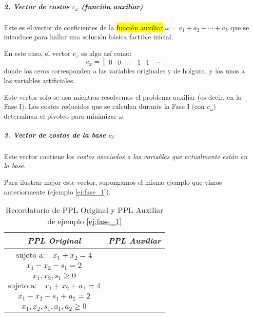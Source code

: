 \subparagraph{2. Vector de costos \(c_\omega\) (función auxiliar)}

Este es el vector de coeficientes de la \hl{función auxiliar} \(\omega = a_1 + a_2 + \cdots + a_k\) que se introduce para hallar una solución básica factible inicial.

En este caso, el vector \(c_\omega\) es algo así como:
\[
  c_\omega = \begin{bmatrix} 0 & 0 & \cdots & 1 & 1 & \cdots \end{bmatrix}
\]
donde los ceros corresponden a las variables originales y de holgura, y los unos a las variables artificiales.

Este vector solo se usa mientras resolvemos el problema auxiliar (es decir, en la Fase I). Los costos reducidos que se calculan durante la Fase I (con \(c_\omega\)) determinan el pivoteo para minimizar \(\omega\).

\vspace{5mm}

\subparagraph{3. Vector de costos de la base \(c_\beta\)}

Este vector contiene los \textit{costos asociados a las variables que actualmente están en la base}.

Para ilustrar mejor este vector, supongamos el mismo ejemplo que vimos anteriormente (ejemplo \ref{ej:fase_1}).

\begin{table}[htbp]
  \centering
  \renewcommand\cellalign{tl}
  \renewcommand\cellgape{\Gape[4pt]}
  \begin{tabular}{c|c}
  \textit{PPL Original} & \textit{PPL Auxiliar} \\
  \hline
  \makecell[l]{
    \(\text{maximizar} \quad z = 3x_1 + 2x_2\)\\[3pt]
    \(\text{sujeto a:} \quad x_1 + x_2 = 4\)\\
    \hspace{4.5em}\(x_1 - x_2 - s_1 = 2\)\\
    \hspace{4.5em}\(x_1, x_2, s_1 \geq 0\)
  }
  &
  \makecell[l]{
    \(\text{maximizar} \quad -\omega = -a_1 - a_2\)\\[3pt]
    \(\text{sujeto a:} \quad x_1 + x_2 + a_1 = 4\)\\
    \hspace{4.5em}\(x_1 - x_2 - s_1 + a_2 = 2\)\\
    \hspace{4.5em}\(x_1, x_2, s_1, a_1, a_2 \geq 0\)
  }
  \\
  \end{tabular}
  \caption{Recordatorio de PPL Original y PPL Auxiliar de ejemplo \ref{ej:fase_1}}
  \label{tab:comparacion_ppl}
\end{table}

